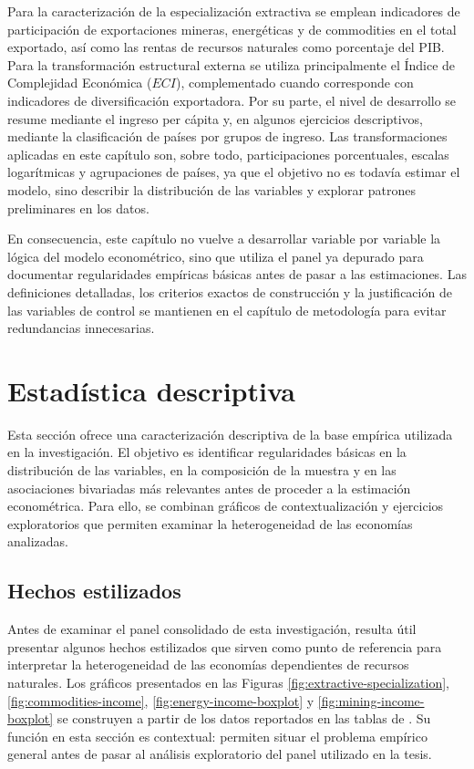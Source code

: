 \documentclass[../../PTFM.tex]{subfiles}
\begin{document}
	Para la caracterización de la especialización extractiva se emplean indicadores de participación de exportaciones mineras, energéticas y de commodities en el total exportado, así como las rentas de recursos naturales como porcentaje del PIB. Para la transformación estructural externa se utiliza principalmente el Índice de Complejidad Económica ($ECI$), complementado cuando corresponde con indicadores de diversificación exportadora. Por su parte, el nivel de desarrollo se resume mediante el ingreso per cápita y, en algunos ejercicios descriptivos, mediante la clasificación de países por grupos de ingreso. Las transformaciones aplicadas en este capítulo son, sobre todo, participaciones porcentuales, escalas logarítmicas y agrupaciones de países, ya que el objetivo no es todavía estimar el modelo, sino describir la distribución de las variables y explorar patrones preliminares en los datos.

	En consecuencia, este capítulo no vuelve a desarrollar variable por variable la lógica del modelo econométrico, sino que utiliza el panel ya depurado para documentar regularidades empíricas básicas antes de pasar a las estimaciones. Las definiciones detalladas, los criterios exactos de construcción y la justificación de las variables de control se mantienen en el capítulo de metodología para evitar redundancias innecesarias.


	\section{Estadística descriptiva}
	\label{sec:estadistica-descriptiva}

	Esta sección ofrece una caracterización descriptiva de la base empírica utilizada en la investigación. El objetivo es identificar regularidades básicas en la distribución de las variables, en la composición de la muestra y en las asociaciones bivariadas más relevantes antes de proceder a la estimación econométrica. Para ello, se combinan gráficos de contextualización y ejercicios exploratorios que permiten examinar la heterogeneidad de las economías analizadas.

	\subsection{Hechos estilizados}
	\label{subsec:hechos-estilizados}

	Antes de examinar el panel consolidado de esta investigación, resulta útil presentar algunos hechos estilizados que sirven como punto de referencia para interpretar la heterogeneidad de las economías dependientes de recursos naturales. Los gráficos presentados en las Figuras \ref{fig:extractive-specialization}, \ref{fig:commodities-income}, \ref{fig:energy-income-boxplot} y \ref{fig:mining-income-boxplot} se construyen a partir de los datos reportados en las tablas de \textcite[27--30]{Anne2021}. Su función en esta sección es contextual: permiten situar el problema empírico general antes de pasar al análisis exploratorio del panel utilizado en la tesis.
\end{document}

